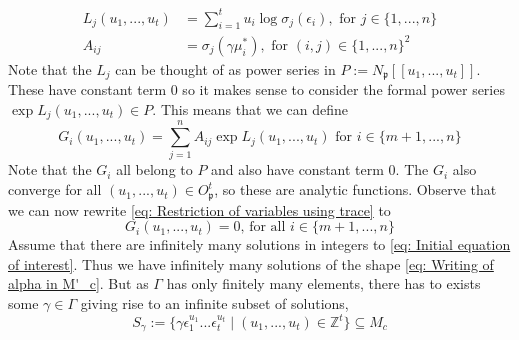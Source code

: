 \documentclass{article}
\newcommand{\mfrak}[1]{\mathfrak{#1}}
\newcommand{\mbb}[1]{\mathbb{#1}}
\numberwithin{equation}{section}
\begin{document}
\begin{align*}
	L_j(u_1, ..., u_t) & = \sum_{i = 1}^{t} u_i \log \sigma_j(\epsilon_i), \text{ for } j \in \{1, ..., n \} \\
	A_{ij}         	& = \sigma_j(\gamma \mu_i^*), \text{ for } (i,j) \in \{1, ..., n\}^2
\end{align*}
Note that the $L_j$ can be thought of as power series in $P := N_\mfrak{p}[[u_1, ..., u_t]]$. These have constant term 0 so it makes sense to consider the formal power series $\exp L_j(u_1, ..., u_t) \in P$. This means that we can define
$$G_i(u_1, ..., u_t) = \sum_{j = 1}^n A_{ij} \exp L_j(u_1, ..., u_t) \text{ for } i \in \{m+1, ..., n \}$$
Note that the $G_i$ all belong to $P$ and also have constant term 0. The $G_i$ also converge for all $(u_1, ..., u_t) \in O_\mfrak p^t$, so these are analytic functions. Observe that we can now rewrite \cref{eq: Restriction of variables using trace} to
\begin{equation}\label{eq: Restriction of variables in terms of power series}
	G_i(u_1, ..., u_t) = 0 \text{, for all } i \in \{m+1, ..., n\}
\end{equation}
Assume that there are infinitely many solutions in integers to \cref{eq: Initial equation of interest}. Thus we have infinitely many solutions of the shape \cref{eq: Writing of alpha in M'_c}. But as $\Gamma$ has only finitely many elements, there has to exists some $\gamma \in \Gamma$ giving rise to an infinite subset of solutions,
$$S_\gamma := \{\gamma \epsilon_1^{u_1} ... \epsilon_t^{u_t} \mid (u_1, ..., u_t) \in \mbb Z^t \} \subseteq M_c$$
\end{document}
